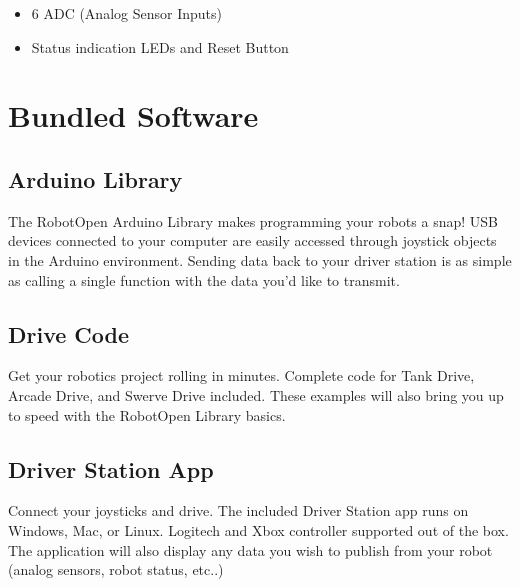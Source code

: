 \documentclass{article}
\begin{document}
\begin{multicols}{2}
\begin{itemize}
\item 6 ADC (Analog Sensor Inputs)

\item Status indication LEDs and Reset Button

\end{itemize}

\section*{Bundled Software}

\subsection*{Arduino Library}

The RobotOpen Arduino Library makes programming your robots a snap! USB devices connected to your computer are easily accessed through joystick objects in the Arduino environment. Sending data back to your driver station is as simple as calling a single function with the data you'd like to transmit.

\subsection*{Drive Code}

Get your robotics project rolling in minutes. Complete code for Tank Drive, Arcade Drive, and Swerve Drive included. These examples will also bring you up to speed with the RobotOpen Library basics.

\subsection*{Driver Station App}

Connect your joysticks and drive. The included Driver Station app runs on Windows, Mac, or Linux. Logitech and Xbox controller supported out of the box. The application will also display any data you wish to publish from your robot (analog sensors, robot status, etc..) 


\end{multicols}
\end{document}
